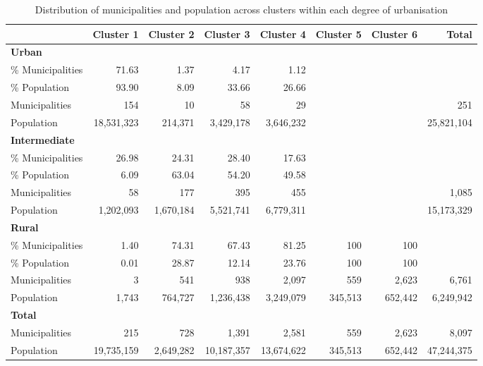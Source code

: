 \documentclass[a4paper,11pt,oneside]{article}
\begin{document}
\begin{table}%
\centering
\caption{Distribution of municipalities and population across clusters within each degree of urbanisation}
\label{tbl:9}
\footnotesize
\begin{tabular}{lrrrrrr|r}
\toprule
 & Cluster 1 & Cluster 2 & Cluster 3 & Cluster 4 & Cluster 5 & Cluster 6 & \textbf{Total} \\
\midrule
\textbf{Urban} & & & & & & & \\
\quad \% Municipalities & 71.63 & 1.37 & 4.17 & 1.12 &   &   &   \\
\quad \% Population     & 93.90 & 8.09 & 33.66 & 26.66 &   &   &   \\
\quad Municipalities    & 154 & 10 & 58 & 29 &   &   & 251 \\
\quad Population        & 18,531,323 & 214,371 & 3,429,178 & 3,646,232 &   &   & 25,821,104 \\
\midrule
\textbf{Intermediate} & & & & & & & \\
\quad \% Municipalities & 26.98 & 24.31 & 28.40 & 17.63 &   &   &   \\
\quad \% Population     & 6.09 & 63.04 & 54.20 & 49.58 &   &   &   \\
\quad Municipalities    & 58 & 177 & 395 & 455 &   &   & 1,085 \\
\quad Population        & 1,202,093 & 1,670,184 & 5,521,741 & 6,779,311 &   &   & 15,173,329 \\
\midrule
\textbf{Rural} & & & & & & & \\
\quad \% Municipalities & 1.40 & 74.31 & 67.43 & 81.25 & 100 & 100 &   \\
\quad \% Population     & 0.01 & 28.87 & 12.14 & 23.76 & 100 & 100 &   \\
\quad Municipalities    & 3 & 541 & 938 & 2,097 & 559 & 2,623 & 6,761 \\
\quad Population        & 1,743 & 764,727 & 1,236,438 & 3,249,079 & 345,513 & 652,442 & 6,249,942 \\
\midrule
\textbf{Total} & & & & & & & \\
\quad Municipalities    & 215 & 728 & 1,391 & 2,581 & 559 & 2,623 & 8,097 \\
\quad Population        & 19,735,159 & 2,649,282 & 10,187,357 & 13,674,622 & 345,513 & 652,442 & 47,244,375 \\
\bottomrule
\end{tabular}
\end{table}
\end{document}
